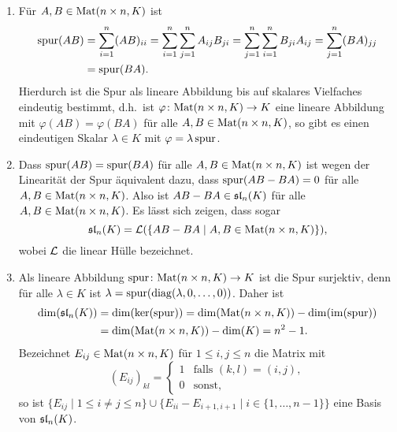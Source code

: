 \begin{bem}
 \begin{enumerate}[leftmargin=*]
  \item
   Für $A, B \in \mathrm{Mat}(n \times n, K)$ ist
   \begin{align*}
    \mathrm{spur}(AB)
    &= \sum_{i=1}^n (AB)_{ii}
    = \sum_{i=1}^n \sum_{j=1}^n A_{ij} B_{ji}
    = \sum_{j=1}^n \sum_{i=1}^n B_{ji} A_{ij}
    = \sum_{j=1}^n (BA)_{jj} \\
    &= \mathrm{spur}(BA).
   \end{align*}
   Hierdurch ist die Spur als lineare Abbildung bis auf skalares Vielfaches eindeutig bestimmt, d.h.\ ist $\varphi \colon \mathrm{Mat}(n \times n, K) \to K$ eine lineare Abbildung mit $\varphi(AB) = \varphi(BA)$ für alle $A,B \in \mathrm{Mat}(n \times n, K)$, so gibt es einen eindeutigen Skalar $\lambda \in K$ mit $\varphi = \lambda\, \mathrm{spur}$.
  \item
   Dass $\mathrm{spur}(AB) = \mathrm{spur}(BA)$ für alle $A,B \in \mathrm{Mat}(n \times n, K)$ ist wegen der Linearität der Spur äquivalent dazu, dass $\mathrm{spur}(AB-BA) = 0$ für alle $A,B \in \mathrm{Mat}(n \times n, K)$. Also ist $AB - BA \in \mathfrak{sl}_n(K)$ für alle $A,B \in \mathrm{Mat}(n \times n, K)$. Es lässt sich zeigen, dass sogar
   \[
    \mathfrak{sl}_n(K) = \mathcal{L}(\{AB-BA \mid A, B \in \mathrm{Mat}(n \times n, K)\}),
   \]
   wobei $\mathcal{L}$ die linear Hülle bezeichnet.
  \item
   Als lineare Abbildung $\mathrm{spur} \colon \mathrm{Mat}(n \times n, K) \to K$ ist die Spur surjektiv, denn für alle $\lambda \in K$ ist $\lambda = \mathrm{spur}(\mathrm{diag}(\lambda, 0, \dotsc, 0))$. Daher ist
   \begin{align*}
    \dim(\mathfrak{sl}_n(K))
    &= \dim(\ker(\mathrm{spur}))
    = \dim(\mathrm{Mat}(n \times n, K)) - \dim(\mathrm{im}(\mathrm{spur})) \\
    &= \dim(\mathrm{Mat}(n \times n, K)) - \dim(K)
    = n^2 - 1.
   \end{align*}
   Bezeichnet $E_{ij} \in \mathrm{Mat}(n \times n, K)$ für $1 \leq i,j \leq n$ die Matrix mit
   \[
    (E_{ij})_{kl}
    =
    \begin{cases}
     1 & \text{falls $(k,l) = (i,j)$}, \\
     0 & \text{sonst},
    \end{cases}
   \]
   so ist $\{E_{ij} \mid 1 \leq i \neq j \leq n\} \cup \{E_{ii} - E_{i+1,i+1} \mid i \in \{1, \dotsc, n-1\}\}$ eine Basis von $\mathfrak{sl}_n(K)$.
 \end{enumerate}
\end{bem}





